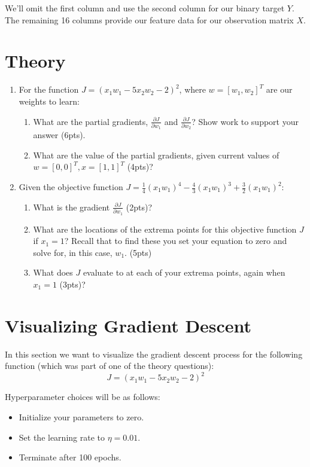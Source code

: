 \documentclass[12pt]{article}
\begin{document}
\noindent
We'll omit the first column and use the second column for our binary target $Y$.  The remaining 16 columns provide our feature data for our observation matrix $X$.

\newpage
\section{Theory}
\begin{enumerate}
\item For the function $J=(x_1 w_1 -5x_2 w_2-2)^2$, where $w=[w_1, w_2]^T$ are our weights to learn:
\begin{enumerate}
\item What are the partial gradients, $\frac{\partial J}{\partial w_1}$ and $\frac{\partial J}{\partial w_2}$?  Show work to support your answer (6pts).
\item What are the value of the partial gradients, given current values of $w=[0, 0]^T, x=[1, 1]^T$ (4pts)?
\end{enumerate}

\item Given the objective function $J=\frac{1}{4}(x_1 w_1)^4-\frac{4}{3}(x_1 w_1)^3+\frac{3}{2}(x_1 w_1)^2$:
\begin{enumerate}
\item What is the gradient $\frac{\partial J}{\partial w_1}$ (2pts)?
\item What are the locations of the extrema points for this objective function $J$ if $x_1=1$?  Recall that to find these you set your equation to zero and solve for, in this case, $w_1$. (5pts)
\item What does $J$ evaluate to at each of your extrema points, again when $x_1=1$ (3pts)?
\end{enumerate}
\end{enumerate}

\newpage
\section{Visualizing Gradient Descent}
In this section we want to visualize the gradient descent process for the following function (which was part of one of the theory questions):
$$J=(x_1 w_1 -5x_2 w_2-2)^2$$

\noindent
Hyperparameter choices will be as follows:
\begin{itemize}
\item Initialize your parameters to zero.
\item Set the learning rate to $\eta=0.01$.
\item Terminate after 100 epochs.
\end{itemize}
\end{document}
